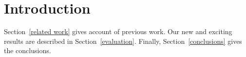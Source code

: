\section{Introduction}










Section~\ref{related work} gives account of previous work.
Our new and exciting results are described in Section~\ref{evaluation}.
Finally, Section~\ref{conclusions} gives the conclusions.
